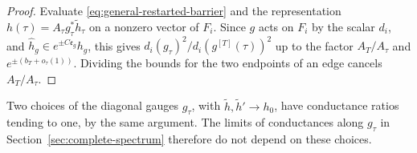 \begin{proof}
Evaluate \eqref{eq:general-restarted-barrier} and the representation
$h(\tau)=A_\tau g_\tau^*\widetilde h_\tau$ on a nonzero vector of $F_i$.
Since $g$ acts on $F_i$ by the scalar $d_i$, and
$\widehat h_g\in e^{\pm C\mathfrak e_g}h_g$, this gives $d_i(g_\tau)^2/d_i(g^{[T]}(\tau))^2$
up to the factor $A_T/A_\tau$ and $e^{\pm(b_T+o_\tau(1))}$. Dividing the
bounds for the two endpoints of an edge cancels $A_T/A_\tau$.
\end{proof}

Two choices of the diagonal gauges $g_\tau$, with
$\widetilde h,\widetilde h'\to h_0$, have conductance ratios tending to one,
by the same argument. The limits of conductances along $g_\tau$ in
Section~\ref{sec:complete-spectrum} therefore do not depend on these
choices.
